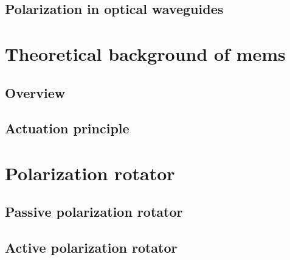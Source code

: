 \documentclass[../report.tex]{subfiles}
\begin{document}
		\subsection{Polarization in optical waveguides}
		
	\section{Theoretical background of \gls{mems}}
	
		\subsection{Overview}
		
		\subsection{Actuation principle}
			
	\section{Polarization rotator}
	
		\subsection{Passive polarization rotator}
	
		\subsection{Active polarization rotator}
\end{document}
